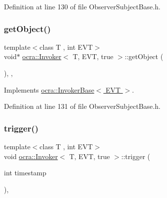 Definition at line 130 of file Observer\+Subject\+Base.\+h.

\hypertarget{classocra_1_1Invoker_3_01T_00_01EVT_00_01true_01_4_ab187a80065f38c9a650e0a5b35185153}{}\label{classocra_1_1Invoker_3_01T_00_01EVT_00_01true_01_4_ab187a80065f38c9a650e0a5b35185153} 
\subsubsection{\texorpdfstring{get\+Object()}{getObject()}}
{\footnotesize\ttfamily template$<$class T , int E\+VT$>$ \\
void$\ast$ \hyperlink{classocra_1_1Invoker}{ocra\+::\+Invoker}$<$ T, E\+VT, true $>$\+::get\+Object (\begin{DoxyParamCaption}{ }\end{DoxyParamCaption})\hspace{0.3cm}{\ttfamily [inline]}, {\ttfamily [protected]}, {\ttfamily [virtual]}}



Implements \hyperlink{classocra_1_1InvokerBase_a90d81926209cb3119933412f742bc245}{ocra\+::\+Invoker\+Base$<$ E\+V\+T $>$}.



Definition at line 131 of file Observer\+Subject\+Base.\+h.

\hypertarget{classocra_1_1Invoker_3_01T_00_01EVT_00_01true_01_4_a9b6283c07e6477a21c4b82b17940d832}{}\label{classocra_1_1Invoker_3_01T_00_01EVT_00_01true_01_4_a9b6283c07e6477a21c4b82b17940d832} 
\subsubsection{\texorpdfstring{trigger()}{trigger()}}
{\footnotesize\ttfamily template$<$class T , int E\+VT$>$ \\
void \hyperlink{classocra_1_1Invoker}{ocra\+::\+Invoker}$<$ T, E\+VT, true $>$\+::trigger (\begin{DoxyParamCaption}\item[{int}]{timestamp }\end{DoxyParamCaption})\hspace{0.3cm}{\ttfamily [inline]}, {\ttfamily [virtual]}}

